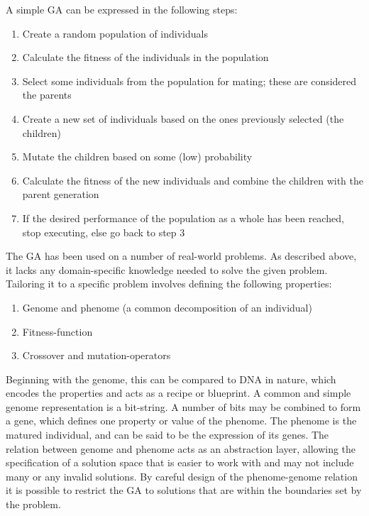 \documentclass[10pt,a4paper]{book}
\begin{document}
A simple \gls{GA} can be expressed in the following steps:

\begin{enumerate}
\item Create a random population of individuals
\item Calculate the fitness of the individuals in the population
\item Select some individuals from the population for mating; these are considered the parents 
\item Create a new set of individuals based on the ones previously selected (the children)
\item Mutate the children based on some (low) probability
\item Calculate the fitness of the new individuals and combine the children with the parent generation
\item If the desired performance of the population as a whole has been reached, stop executing, else go back to step 3

\end{enumerate} 


The \gls{GA} has been used on a number of real-world problems. As described above, it lacks any domain-specific knowledge needed to solve the given problem. Tailoring it to a specific problem involves defining the following properties:

\begin{enumerate}
\item Genome and phenome (a common decomposition of an individual)
\item Fitness-function
\item Crossover and mutation-operators
\end{enumerate}

Beginning with the genome, this can be compared to DNA in nature, which encodes the properties and acts as a recipe or blueprint. A common and simple genome representation is a bit-string. A number of bits may be combined to form a gene, which defines one property or value of the phenome. The phenome is the matured individual, and can be said to be the expression of its genes. The relation between genome and phenome acts as an abstraction layer, allowing the specification of a solution space that is easier to work with and may not include many or any invalid solutions. By careful design of the phenome-genome relation it is possible to restrict the \gls{GA} to solutions that are within the boundaries set by the problem. 
\end{document}
